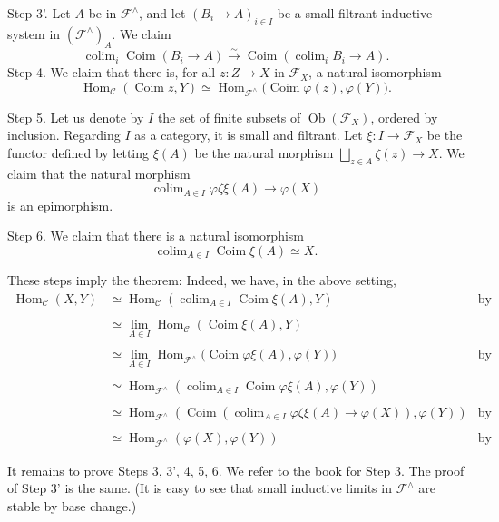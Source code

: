 \documentclass[12pt]{article}
\theoremstyle{remark}
\theoremstyle{definition}
\newcommand{\C}{\mathcal C}
\newcommand{\F}{\mathcal F}
\DeclareMathOperator*{\coli}{colim}
\DeclareMathOperator{\Coim}{Coim}
\DeclareMathOperator{\Hom}{Hom}%
\DeclareMathOperator{\Ob}{Ob}
\begin{document}
\noindent Step 3'. Let $A$ be in $\F^\wedge$, and let $(B_i\to A)_{i\in I}$ be a small filtrant inductive system in $(\F^\wedge)_A$. We claim 
$$
\coli_i\Coim(B_i\to A)\xrightarrow{\sim}
\Coim\left(\coli_iB_i\to A\right).
$$
Step 4. We claim that there is, for all $z:Z\to X$ in $\F_X$, a natural isomorphism 
$$\Hom_\C(\Coim z,Y)\simeq\Hom_{\F^\wedge}\Big(\Coim\varphi(z),\varphi(Y)\Big).
$$ 

\noindent Step 5. Let us denote by $I$ the set of finite subsets of $\Ob(\F_X)$, ordered by inclusion. Regarding $I$ as a category, it is small and filtrant. Let $\xi:I\to\F_X$ be the functor defined by letting $\xi(A)$ be the natural morphism $\bigsqcup_{z\in A}\zeta(z)\to X$. We claim that the natural morphism 
$$
\coli_{A\in I}\varphi\zeta\xi(A)\to\varphi(X) 
$$ 
is an epimorphism.

\noindent Step 6. We claim that there is a natural isomorphism 
$$
\coli_{A\in I}\Coim\xi(A)\simeq X. 
$$

These steps imply the theorem: Indeed, we have, in the above setting, 
%
\begin{align*} 
%
\Hom_\C(X,Y)&\simeq\Hom_\C\left(\coli_{A\in I}\Coim\xi(A),Y\right)&\text{by Step 6}\\ \\ 
%
&\simeq\lim_{A\in I}\Hom_\C(\Coim\xi(A),Y)\\ \\ 
%
&\simeq\lim_{A\in I}\Hom_{\F^\wedge}\Big(\Coim\varphi\xi(A),\varphi(Y)\Big)&\text{by Step 4}\\ \\ 
%
&\simeq\Hom_{\F^\wedge}\left(\coli_{A\in I}\Coim\varphi\xi(A),\varphi(Y)\right)\\ \\ 
%
&\simeq\Hom_{\F^\wedge}\left(\Coim\left(\coli_{A\in I}\varphi\zeta\xi(A)\to\varphi(X)\right),\varphi(Y)\right)&\text{by Step 3'}\\ \\ 
%
&\simeq\Hom_{\F^\wedge}(\varphi(X),\varphi(Y))&\text{by Step 5.}
%
\end{align*} 
%

It remains to prove Steps 3, 3', 4, 5, 6. We refer to the book for Step 3. The proof of Step 3' is the same. (It is easy to see that small inductive limits in $\F^\wedge$ are stable by base change.) 
\end{document}
